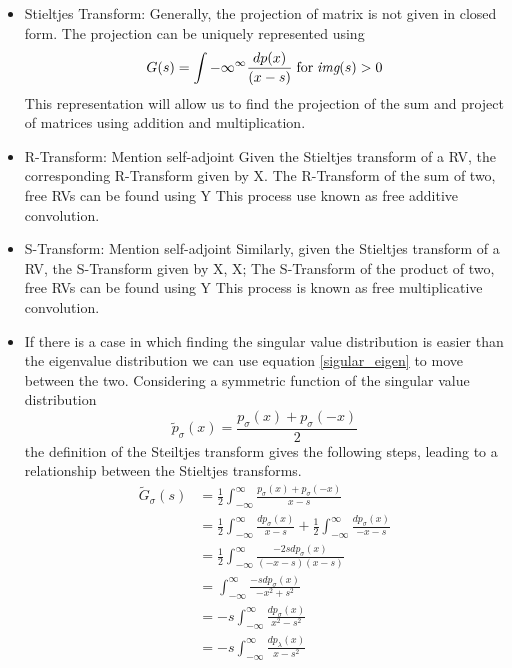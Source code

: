 \documentclass[12pt,a4paper]{report}
\begin{document}
\begin{itemize}
\begin{itemize}
	 	\item 
	 	Stieltjes Transform: 
	 	Generally, the projection of matrix is not given in closed form. The projection can be uniquely represented using
		\begin{equation}\label{stieltjes}
		G(s) = \int{-\infty}^{\infty} \frac{dp(x)}{(x - s)} \; \text{for} \; \textit{img}(s) > 0
		\end{equation}	
		This representation will allow us to find the projection of the sum and project of matrices using addition and multiplication.
		\item 
		R-Transform:
		Mention self-adjoint
		Given the Stieltjes transform of a RV, the corresponding R-Transform given by 
		X. 
		The R-Transform of the sum of two, free RVs can be found using
		Y
		This process use known as free additive convolution.
		\item
		S-Transform:
		Mention self-adjoint
		Similarly, given the Stieltjes transform of a RV, the S-Transform given by 
		X, X;
		The S-Transform of the product of two, free RVs can be found using
		Y
		This process is known as free multiplicative convolution.
	 	\item 
	 	If there is a case in which finding the singular value distribution is easier than the eigenvalue distribution we can use equation  
	 	 \eqref{sigular_eigen} to move between the two. Considering a symmetric function of the singular value distribution
	 	 \begin{equation}\label{symmetric}
	 	 \tilde{p}_{\sigma}(x) = \frac{p_{\sigma}(x) + p_{\sigma}(-x)}{2}
	 	 \end{equation}
	 	 the definition of the Steiltjes transform gives the following steps, leading to a relationship between the Stieltjes transforms. 
	 	 \begin{align*}
	 	 \tilde{G}_\sigma (s) & =  \frac{1}{2} \int_{-\infty}^{\infty} \frac{p_{\sigma}(x) + p_{\sigma}(-x)}{x-s}
	 	 \\&  =  
	 	 \frac{1}{2} \int_{-\infty}^{\infty} \frac{dp_{\sigma}(x)}{x - s} + 
	 	 \frac{1}{2} \int_{-\infty}^{\infty} \frac{dp_{\sigma}(x)}{-x - s}
	 	 \\&  =  
	 	 	 	 \frac{1}{2} \int_{-\infty}^{\infty} \frac{-2s dp_{\sigma}(x)}{(-x - s)(x - s)}
	  	 \\&  =  
	 	 	 	\int_{-\infty}^{\infty} \frac{-s dp_{\sigma}(x)}{-x^2 + s^2} 	
 	 	  	 \\&  =  
 	 	 	-s  \int_{-\infty}^{\infty}  \frac{dp_{\sigma}(x)}{ x^2 - s^2} 	 
 	 	 \\&  =  
			-s  \int_{-\infty}^{\infty}  \frac{dp_{\lambda}(x)}{ x - s^2} 

\end{align*}
\end{itemize}
\end{itemize}
\end{document}
